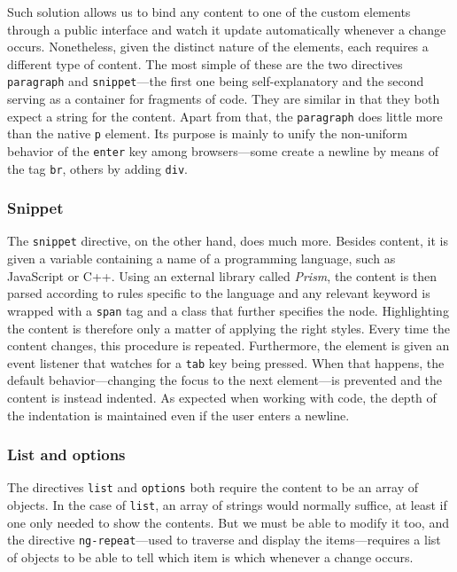 \documentclass[thesis=M,english,hidelinks]{FITthesis}[2012/10/20]
\newcommand{\code}{\texttt}
\begin{document}
Such solution allows us to bind any content to one of the custom elements through a public interface and watch it update automatically whenever a change occurs. Nonetheless, given the distinct nature of the elements, each requires a different type of content. The most simple of these are the two directives \code{paragraph} and \code{snippet}---the first one being self-explanatory and the second serving as a container for fragments of code. They are similar in that they both expect a string for the content. Apart from that, the \code{paragraph} does little more than the native \code{p} element. Its purpose is mainly to unify the non-uniform behavior of the \code{enter} key among browsers---some create a newline by means of the tag \code{br}, others by adding \code{div}.

      \subsubsection{Snippet}

The \code{snippet} directive, on the other hand, does much more. Besides content, it is given a variable containing a name of a programming language, such as JavaScript or C++. Using an external library called \textit{Prism}, the content is then parsed according to rules specific to the language and any relevant keyword is wrapped with a \code{span} tag and a class that further specifies the node. Highlighting the content is therefore only a matter of applying the right styles. Every time the content changes, this procedure is repeated. Furthermore, the element is given an event listener that watches for a \code{tab} key being pressed. When that happens, the default behavior---changing the focus to the next element---is prevented and the content is instead indented. As expected when working with code, the depth of the indentation is maintained even if the user enters a newline.

      \subsubsection{List and options}

The directives \code{list} and \code{options} both require the content to be an array of objects. In the case of \code{list}, an array of strings would normally suffice, at least if one only needed to show the contents. But we must be able to modify it too, and the directive \code{ng-repeat}---used to traverse and display the items---requires a list of objects to be able to tell which item is which whenever a change occurs.
\end{document}
